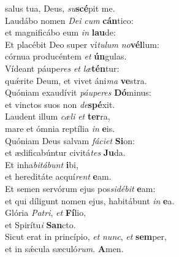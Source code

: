 \evenverse salus tua, Deus, \textit{su}\textbf{scé}pit me.\\
\oddverse Laudábo nomen \textit{De}\textit{i} \textit{cum} \textbf{cán}tico:~\*\\
\oddverse et magnificábo eum \textit{in} \textbf{lau}de:\\
\evenverse Et placébit Deo super ví\textit{tu}\textit{lum} \textit{no}\textbf{vél}lum:~\*\\
\evenverse córnua producéntem \textit{et} \textbf{ún}gulas.\\
\oddverse Vídeant páupe\textit{res} \textit{et} \textit{læ}\textbf{tén}tur:~\*\\
\oddverse quǽrite Deum, et vivet áni\textit{ma} \textbf{ve}stra.\\
\evenverse Quóniam exaudívit \textit{páu}\textit{pe}\textit{res} \textbf{Dó}minus:~\*\\
\evenverse et vinctos suos non \textit{de}\textbf{spé}xit.\\
\oddverse Laudent illum \textit{cæ}\textit{li} \textit{et} \textbf{ter}ra,~\*\\
\oddverse mare et ómnia reptília \textit{in} \textbf{e}is.\\
\evenverse Quóniam Deus salvam \textit{fá}\textit{ci}\textit{et} \textbf{Si}on:~\*\\
\evenverse et ædificabúntur civitá\textit{tes} \textbf{Ju}da.\\
\oddverse Et inha\textit{bi}\textit{tá}\textit{bunt} \textbf{i}bi,~\*\\
\oddverse et hereditáte acquí\textit{rent} \textbf{e}am.\\
\evenverse Et semen servórum ejus pos\textit{si}\textit{dé}\textit{bit} \textbf{e}am:~\*\\
\evenverse et qui díligunt nomen ejus, habitábunt \textit{in} \textbf{e}a.\\
\oddverse Glória \textit{Pa}\textit{tri}, \textit{et} \textbf{Fí}lio,~\*\\
\oddverse et Spirítu\textit{i} \textbf{San}cto.\\
\evenverse Sicut erat in princípio, \textit{et} \textit{nunc}, \textit{et} \textbf{sem}per,~\*\\
\evenverse et in sǽcula sæculó\textit{rum}. \textbf{A}men.\\
